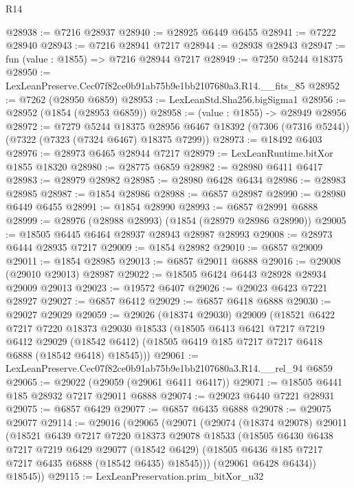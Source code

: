 \begin{lexlean}{R14}
\begin{coremodule}
@28938 := @7216 @28937
@28940 := @28925 @6449 @6455
@28941 := @7222 @28940
@28943 := @7216 @28941 @7217
@28944 := @28938 @28943
@28947 := fun (value : @1855) => @7216 @28944 @7217
@28949 := @7250 @5244 @18375
@28950 := LexLeanPreserve.Cec07f82ce0b91ab75b9e1bb2107680a3.R14.__fits_85
@28952 := @7262 (@28950 @6859)
@28953 := LexLeanStd.Sha256.bigSigma1
@28956 := @28952 (@1854 (@28953 @6859))
@28958 := (value : @1855) -> @28949 @28956
@28972 := @7279
    @5244
    @18375
    @28956
    @6467
    @18392
    (@7306 (@7316 @5244))
    (@7322 (@7323 (@7324 @6467) @18375 @7299))
@28973 := @18492 @6403
@28976 := @28973 @6465 @28944 @7217
@28979 := LexLeanRuntime.bitXor @1855 @18320
@28980 := @28775 @6859
@28982 := @28980 @6411 @6417
@28983 := @28979 @28982
@28985 := @28980 @6428 @6434
@28986 := @28983 @28985
@28987 := @1854 @28986
@28988 := @6857 @28987
@28990 := @28980 @6449 @6455
@28991 := @1854 @28990
@28993 := @6857 @28991 @6888
@28999 := @28976 (@28988 @28993) (@1854 (@28979 @28986 @28990))
@29005 := @18505 @6445 @6464 @28937 @28943 @28987 @28993
@29008 := @28973 @6444 @28935 @7217
@29009 := @1854 @28982
@29010 := @6857 @29009
@29011 := @1854 @28985
@29013 := @6857 @29011 @6888
@29016 := @29008 (@29010 @29013) @28987
@29022 := @18505 @6424 @6443 @28928 @28934 @29009 @29013
@29023 := @19572 @6407
@29026 := @29023 @6423 @7221 @28927
@29027 := @6857 @6412
@29029 := @6857 @6418 @6888
@29030 := @29027 @29029
@29059 := @29026
    (@18374 @29030)
    @29009
    (@18521
      @6422
      @7217
      @7220
      @18373
      @29030
      @18533
      (@18505
        @6413
        @6421
        @7217
        @7219
        @6412
        @29029
        (@18542 @6412)
        (@18505 @6419 @185 @7217 @7217 @6418 @6888 (@18542 @6418) @18545)))
@29061 := LexLeanPreserve.Cec07f82ce0b91ab75b9e1bb2107680a3.R14.__rel_94 @6859
@29065 := @29022 (@29059 (@29061 @6411 @6417))
@29071 := @18505 @6441 @185 @28932 @7217 @29011 @6888
@29074 := @29023 @6440 @7221 @28931
@29075 := @6857 @6429
@29077 := @6857 @6435 @6888
@29078 := @29075 @29077
@29114 := @29016
    (@29065
      (@29071
        (@29074
          (@18374 @29078)
          @29011
          (@18521
            @6439
            @7217
            @7220
            @18373
            @29078
            @18533
            (@18505
              @6430
              @6438
              @7217
              @7219
              @6429
              @29077
              (@18542 @6429)
              (@18505 @6436 @185 @7217 @7217 @6435 @6888 (@18542 @6435) @18545)))
          (@29061 @6428 @6434))
        @18545))
@29115 := LexLeanPreservation.prim_bitXor_u32

\end{coremodule}
\end{lexlean}
